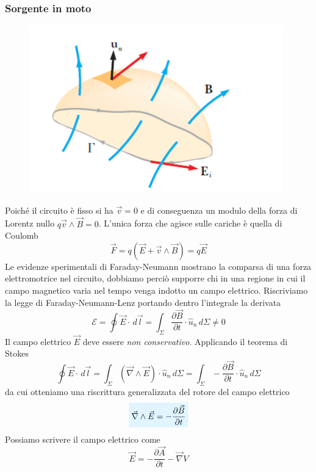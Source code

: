\documentclass[x11names]{report}
\begin{document}
\subsubsection{Sorgente in moto}
\begin{figure}
	\vspace{-1cm}
	\includegraphics[scale=0.5]{img/farad_2.png}
\end{figure}
Poiché il circuito è fisso si ha \(\vec{v}=0\) e di conseguenza un modulo della forza di Lorentz nullo \(q\vec{v}\wedge\vec{B} = 0\). L'unica forza che agisce sulle cariche è quella di Coulomb
\[
\vec{F} = q\left(\vec{E} + \vec{v}\wedge\vec{B}\right) = q\vec{E}
\]
Le evidenze sperimentali di Faraday-Neumann mostrano la comparsa di una forza elettromotrice nel circuito, dobbiamo perciò supporre chi in una regione in cui il campo magnetico varia nel tempo venga indotto un campo elettrico. Riscriviamo la legge di Faraday-Neumann-Lenz portando dentro l'integrale la derivata
\[
\mathcal{E} = \oint \vec{E}\cdot \, d\vec{l} = \int_\Sigma \frac{\partial \vec{B}}{\partial t} \cdot \hat{u}_n  \, d\Sigma \neq 0
\]
Il campo elettrico \(\vec{E}\) deve essere \textit{non conservativo}. Applicando il teorema di Stokes
\[
\oint \vec{E}\cdot \, d\vec{l} = \int_\Sigma\left(\vec{\nabla}\wedge\vec{E}\right)\cdot \hat{u}_n \, d\Sigma = \int_\Sigma -\frac{\partial \vec{B}}{\partial t} \cdot \hat{u}_n  \, d\Sigma
\]
da cui otteniamo una riscrittura generalizzata del rotore del campo elettrico
\begin{equation}
	\viola{\vec{\nabla}\wedge\vec{E} = -\frac{\partial \vec{B}}{\partial t}}
\end{equation}
Possiamo scrivere il campo elettrico come
\begin{equation}
	\vec{E} = -\frac{\partial \vec{A}}{\partial t} - \vec{\nabla}V
\end{equation}
\end{document}
